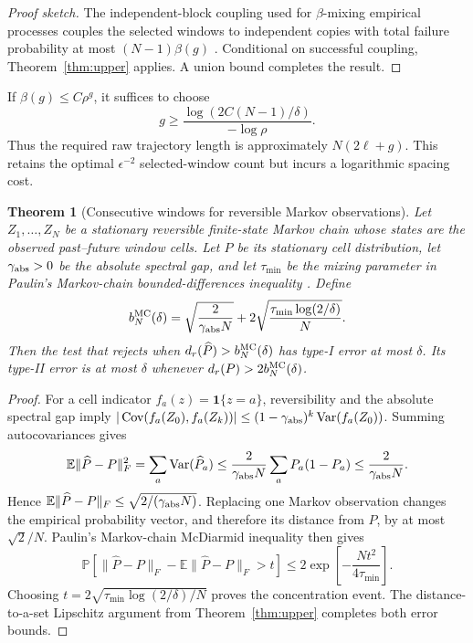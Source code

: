 \documentclass[11pt]{article}
\newtheorem{theorem}{Theorem}
\newcommand{\Prob}{\mathbb{P}}
\newcommand{\E}{\mathbb{E}}
\begin{document}
\begin{proof}[Proof sketch]
The independent-block coupling used for $\beta$-mixing empirical processes couples the selected windows to independent copies with total failure probability at most $(N-1)\beta(g)$ \cite{yu1994mixing}. Conditional on successful coupling, Theorem~\ref{thm:upper} applies. A union bound completes the result.
\end{proof}

If $\beta(g)\le C\rho^g$, it suffices to choose
\[
    g\ge \frac{\log(2C(N-1)/\delta)}{-\log\rho}.
\]
Thus the required raw trajectory length is approximately $N(2\ell+g)$. This retains the optimal $\epsilon^{-2}$ selected-window count but incurs a logarithmic spacing cost.

\begin{theorem}[Consecutive windows for reversible Markov observations]
\label{thm:markovdirect}
Let $Z_1,\ldots,Z_N$ be a stationary reversible finite-state Markov chain whose states are the observed past--future window cells. Let $P$ be its stationary cell distribution, let $\gamma_{\rm abs}>0$ be the absolute spectral gap, and let $\tau_{\min}$ be the mixing parameter in Paulin's Markov-chain bounded-differences inequality \cite{paulin2015concentration}. Define
\begin{equation}
 b_N^{\rm MC}(\delta)
 =\sqrt{\frac{2}{\gamma_{\rm abs}N}}
 +2\sqrt{\frac{\tau_{\min}\log(2/\delta)}{N}}.
 \label{eq:markovthreshold}
\end{equation}
Then the test that rejects when $d_r(\widehat P)>b_N^{\rm MC}(\delta)$ has type-I error at most $\delta$. Its type-II error is at most $\delta$ whenever $d_r(P)>2b_N^{\rm MC}(\delta)$.
\end{theorem}

\begin{proof}
For a cell indicator $f_a(z)=\mathbf 1\{z=a\}$, reversibility and the absolute spectral gap imply
$|\operatorname{Cov}(f_a(Z_0),f_a(Z_k))|\le(1-\gamma_{\rm abs})^k\operatorname{Var}(f_a(Z_0))$.
Summing autocovariances gives
\[
 \E\|\widehat P-P\|_F^2
 =\sum_a\operatorname{Var}(\widehat P_a)
 \le \frac{2}{\gamma_{\rm abs}N}\sum_a P_a(1-P_a)
 \le \frac{2}{\gamma_{\rm abs}N}.
\]
Hence $\E\|\widehat P-P\|_F\le\sqrt{2/(\gamma_{\rm abs}N)}$. Replacing one Markov observation changes the empirical probability vector, and therefore its distance from $P$, by at most $\sqrt2/N$. Paulin's Markov-chain McDiarmid inequality then gives
\[
 \Prob\!\left[\|\widehat P-P\|_F-\E\|\widehat P-P\|_F>t\right]
 \le 2\exp\!\left[-\frac{Nt^2}{4\tau_{\min}}\right].
\]
Choosing $t=2\sqrt{\tau_{\min}\log(2/\delta)/N}$ proves the concentration event. The distance-to-a-set Lipschitz argument from Theorem~\ref{thm:upper} completes both error bounds.
\end{proof}
\end{document}
